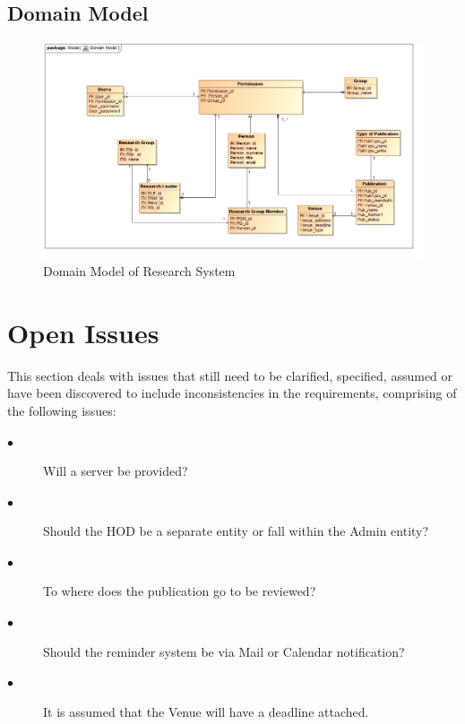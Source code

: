 \documentclass[a4paper]{article}
\begin{document}
	\subsection{Domain Model}
	\begin{figure}[H]
		\includegraphics[width=\textwidth]{DomainModel.jpg}
		\caption{Domain Model of Research System \label{overflow}}
	\end{figure}
	\section{Open Issues}
	This section deals with issues that still need to be clarified, specified, assumed or have been discovered to include inconsistencies in the requirements, comprising of the following issues:
	\begin{description}
		\item[$\bullet$] Will a server be provided?
	\end{description}
	\begin{description}
		\item[$\bullet$] Should the HOD be a separate entity or fall within the Admin entity?
	\end{description}
	\begin{description}
	\item[$\bullet$] To where does the publication go to be reviewed?
	\end{description}
	\begin{description}
	\item[$\bullet$] Should the reminder system be via Mail or Calendar notification?
	\end{description}
	\begin{description}
	\item[$\bullet$] It is assumed that the Venue will have a deadline attached.
	\end{description}
		
\end{document}
